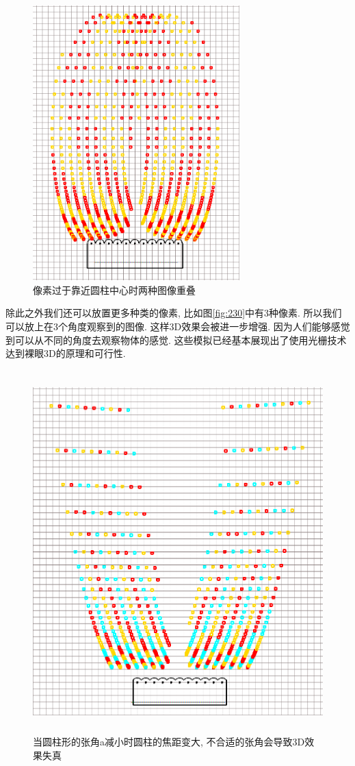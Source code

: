 \documentclass[a4paper, 11pt]{article}
\begin{document}
\begin{CJK}{UTF8}{gbsn}
\begin{figure}[h!]
  \centerline{\includegraphics[width=8cm]{229.png}}
  \caption{像素过于靠近圆柱中心时两种图像重叠}
  \label{fig:229}
\end{figure}

除此之外我们还可以放置更多种类的像素, 比如图\ref{fig:230}中有3种像素. 所以我们可以放上在3个角度观察到的图像. 这样3D效果会被进一步增强. 因为人们能够感觉到可以从不同的角度去观察物体的感觉. 这些模拟已经基本展现出了使用光栅技术达到裸眼3D的原理和可行性.

\begin{figure}[h!]
  \centerline{\includegraphics[height=14cm]{231.png}}
  \caption{当圆柱形的张角a减小时圆柱的焦距变大, 不合适的张角会导致3D效果失真}
  \label{fig:231}
\end{figure}


\end{CJK}
\end{document}

